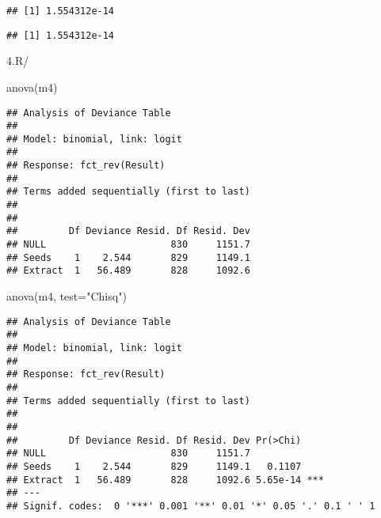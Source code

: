 \documentclass[
]{article}
\newenvironment{Shaded}{\begin{snugshade}}{\end{snugshade}}
\newcommand{\AttributeTok}[1]{\textcolor[rgb]{0.77,0.63,0.00}{#1}}
\newcommand{\DecValTok}[1]{\textcolor[rgb]{0.00,0.00,0.81}{#1}}
\newcommand{\FunctionTok}[1]{\textcolor[rgb]{0.00,0.00,0.00}{#1}}
\newcommand{\NormalTok}[1]{#1}
\newcommand{\SpecialCharTok}[1]{\textcolor[rgb]{0.00,0.00,0.00}{#1}}
\newcommand{\StringTok}[1]{\textcolor[rgb]{0.31,0.60,0.02}{#1}}
\begin{document}
\begin{verbatim}
## [1] 1.554312e-14
\end{verbatim}

\begin{Shaded}
\end{Shaded}

\begin{verbatim}
## [1] 1.554312e-14
\end{verbatim}

4.R/

\begin{Shaded}
\begin{Highlighting}[]
\FunctionTok{anova}\NormalTok{(m4)}
\end{Highlighting}
\end{Shaded}

\begin{verbatim}
## Analysis of Deviance Table
## 
## Model: binomial, link: logit
## 
## Response: fct_rev(Result)
## 
## Terms added sequentially (first to last)
## 
## 
##         Df Deviance Resid. Df Resid. Dev
## NULL                      830     1151.7
## Seeds    1    2.544       829     1149.1
## Extract  1   56.489       828     1092.6
\end{verbatim}

\begin{Shaded}
\begin{Highlighting}[]
\FunctionTok{anova}\NormalTok{(m4, }\AttributeTok{test=}\StringTok{"Chisq"}\NormalTok{)}
\end{Highlighting}
\end{Shaded}

\begin{verbatim}
## Analysis of Deviance Table
## 
## Model: binomial, link: logit
## 
## Response: fct_rev(Result)
## 
## Terms added sequentially (first to last)
## 
## 
##         Df Deviance Resid. Df Resid. Dev Pr(>Chi)    
## NULL                      830     1151.7             
## Seeds    1    2.544       829     1149.1   0.1107    
## Extract  1   56.489       828     1092.6 5.65e-14 ***
## ---
## Signif. codes:  0 '***' 0.001 '**' 0.01 '*' 0.05 '.' 0.1 ' ' 1
\end{verbatim}
\end{document}
